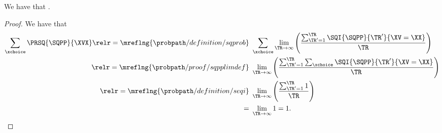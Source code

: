 \begin{proposition}
  We have that \sqprobsumoneprop.%
\end{proposition}

\begin{proof}
  We have that
  \begin{align*}
    \sum_{\xchoice}\PRSQ{\SQPP}{\XVX} 
    \relr = {\mreflng{\probpath/definition/sqprob}} &\ \sum_{\xchoice} \lim_{\TR \rightarrow \infty}\left(\frac{\sum_{\TR' = 1}^{\TR}\SQI{\SQPP}{\TR'}{\XV = \XX}}{\TR}\right)\\
    \relr = {\mreflng{\probpath/proof/sqpplimdef}} &\ \lim_{\TR \rightarrow \infty}\left(\frac{\sum_{\TR' = 1}^{\TR}\sum_{\xchoice}\SQI{\SQPP}{\TR'}{\XV = \XX}}{\TR}\right)\\
    \relr = {\mreflng{\probpath/definition/seqi}} &\ \lim_{\TR \rightarrow \infty}\left(\frac{\sum_{\TR' = 1}^{\TR}1}{\TR}\right)\\
    =  &\ \lim_{\TR \rightarrow \infty}1 = 1.
  \end{align*}
\end{proof}
